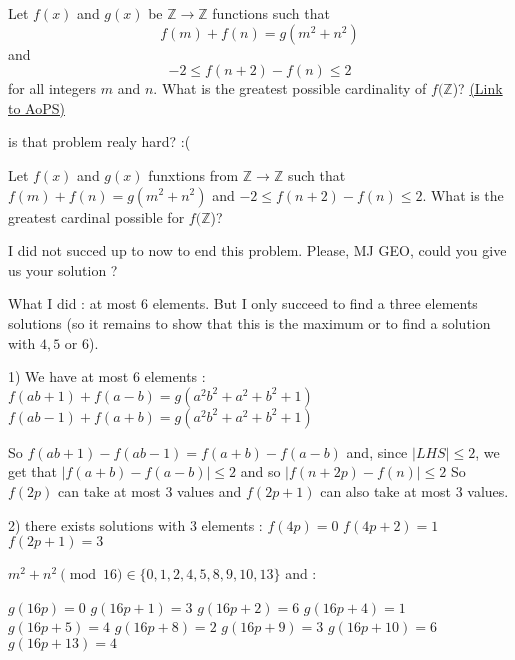 \begin{problem}
	Let $ f(x)$ and $ g(x)$ be $ \mathbb Z\to\mathbb Z$ functions such that \[ f(m)+f(n)=g(m^2+n^2)\] and \[ -2\le f(n+2)-f(n)\le 2\] for all integers $m$ and $n$. What is the greatest possible cardinality of $ f(\mathbb Z$)?
	\flushright \href{https://artofproblemsolving.com/community/c6h316348}{(Link to AoPS)}
\end{problem}



\begin{solution}
	is that problem realy hard?  :(
\end{solution}



\begin{solution}
	\begin{tcolorbox}Let $ f(x)$ and $ g(x)$ funxtions from $ \mathbb Z\to\mathbb Z$ such that $ f(m)+f(n)=g(m^2+n^2)$ and $ -2\le f(n+2)-f(n)\le 2$.
What is the greatest cardinal possible for $ f(\mathbb Z$)? \end{tcolorbox}

I did not succed up to now to end this problem. Please, MJ GEO, could you give us your solution ?

What I did : at most $ 6$ elements. But I only succeed to find a three elements solutions (so it remains to show that this is the maximum or to find a solution with $ 4,5$ or $ 6$).

1) We have at most 6 elements :
$ f(ab+1)+f(a-b)=g(a^2b^2+a^2+b^2+1)$
$ f(ab-1)+f(a+b)=g(a^2b^2+a^2+b^2+1)$

So $ f(ab+1)-f(ab-1)=f(a+b)-f(a-b)$ and, since $ |LHS|\le 2$, we get that $ |f(a+b)-f(a-b)|\le 2$ and so $ |f(n+2p)-f(n)|\le 2$
So $ f(2p)$ can take at most $ 3$ values and $ f(2p+1)$ can also take at most $ 3$ values.

2) there exists solutions with $ 3$ elements :
$ f(4p)=0$
$ f(4p+2)=1$
$ f(2p+1)=3$

$ m^2+n^2\pmod{16}\in\{0,1,2,4,5,8,9,10,13\}$ and :

$ g(16p)=0$
$ g(16p+1)=3$
$ g(16p+2)=6$
$ g(16p+4)=1$
$ g(16p+5)=4$
$ g(16p+8)=2$
$ g(16p+9)=3$
$ g(16p+10)=6$
$ g(16p+13)=4$
\end{solution}



